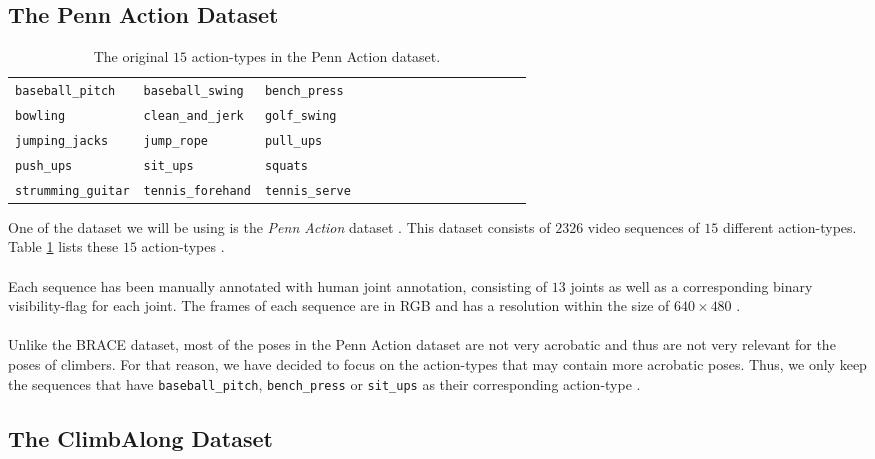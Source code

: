 \documentclass[./main.tex]{subfiles}
\begin{document}
\subsection{The Penn Action Dataset}
\begin{table}
    \begin{tabular}[htbp]{lllllllllllllll}
        \texttt{baseball\_pitch} & \texttt{baseball\_swing} & \texttt{bench\_press} \\
        \texttt{bowling} & \texttt{clean\_and\_jerk} & \texttt{golf\_swing} \\
        \texttt{jumping\_jacks} & \texttt{jump\_rope} & \texttt{pull\_ups} \\
        \texttt{push\_ups} & \texttt{sit\_ups} & \texttt{squats} \\
        \texttt{strumming\_guitar} & \texttt{tennis\_forehand} & \texttt{tennis\_serve}
    \end{tabular}
    \caption{The original $15$ action-types in the Penn Action dataset.}
    \label{tab:PA_actions}
\end{table}
One of the dataset we will be using is the \textit{Penn Action} dataset \cite{penn_action}. This dataset consists of $2326$ video sequences of $15$ different action-types. Table \ref{tab:PA_actions} lists these $15$ action-types \cite{penn_action}.
\\
\\
Each sequence has been manually annotated with human joint annotation, consisting of $13$ joints as well as a corresponding binary visibility-flag for each joint. The frames of each sequence are in RGB and has a resolution within the size of $640 \times 480$ \cite{penn_action}.
\\
\\
Unlike the BRACE dataset, most of the poses in the Penn Action dataset are not very acrobatic and thus are not very relevant for the poses of climbers. For that reason, we have decided to focus on the action-types that may contain more acrobatic poses. Thus, we only keep the sequences that have \texttt{baseball\_pitch}, \texttt{bench\_press} or \texttt{sit\_ups} as their corresponding action-type \cite{penn_action}.

\subsection{The ClimbAlong Dataset}
\end{document}
